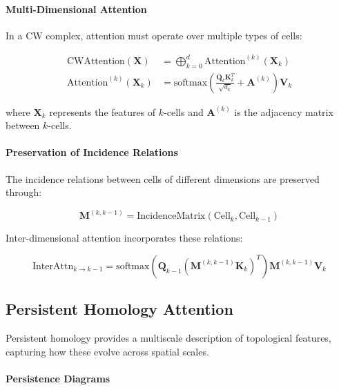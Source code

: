 \paragraph{Multi-Dimensional Attention}

In a CW complex, attention must operate over multiple types of cells:

\begin{align}
\text{CWAttention}(\mathbf{X}) &= \bigoplus_{k=0}^{d} \text{Attention}^{(k)}(\mathbf{X}_k) \label{eq:cw_attention} \\
\text{Attention}^{(k)}(\mathbf{X}_k) &= \text{softmax}\left(\frac{\mathbf{Q}_k \mathbf{K}_k^T}{\sqrt{d_k}} + \mathbf{A}^{(k)}\right) \mathbf{V}_k
\end{align}

where $\mathbf{X}_k$ represents the features of $k$-cells and $\mathbf{A}^{(k)}$ is the adjacency matrix between $k$-cells.

\paragraph{Preservation of Incidence Relations}

The incidence relations between cells of different dimensions are preserved through:

\begin{equation}
\mathbf{M}^{(k,k-1)} = \text{IncidenceMatrix}(\text{Cell}_k, \text{Cell}_{k-1})
\label{eq:incidence_preservation}
\end{equation}

Inter-dimensional attention incorporates these relations:

\begin{equation}
\text{InterAttn}_{k \to k-1} = \text{softmax}(\mathbf{Q}_{k-1} (\mathbf{M}^{(k,k-1)} \mathbf{K}_k)^T) \mathbf{M}^{(k,k-1)} \mathbf{V}_k
\label{eq:inter_dimensional_attention}
\end{equation}

\subsection{Persistent Homology Attention}

Persistent homology provides a multiscale description of topological features, capturing how these evolve across spatial scales.

\paragraph{Persistence Diagrams}

